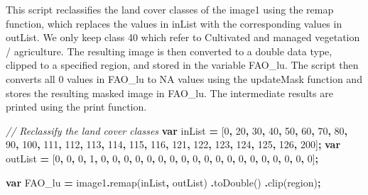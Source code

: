\documentclass[
  10pt,
  b5paper,
  oneside]{book}
\newenvironment{Shaded}{\begin{snugshade}}{\end{snugshade}}
\newcommand{\CommentTok}[1]{\textcolor[rgb]{0.56,0.35,0.01}{\textit{#1}}}
\newcommand{\DecValTok}[1]{\textcolor[rgb]{0.00,0.00,0.81}{#1}}
\newcommand{\FunctionTok}[1]{\textcolor[rgb]{0.00,0.00,0.00}{#1}}
\newcommand{\KeywordTok}[1]{\textcolor[rgb]{0.13,0.29,0.53}{\textbf{#1}}}
\newcommand{\NormalTok}[1]{#1}
\newcommand{\OperatorTok}[1]{\textcolor[rgb]{0.81,0.36,0.00}{\textbf{#1}}}
\begin{document}
This script reclassifies the land cover classes of the image1 using the remap function, which replaces the values in inList with the corresponding values in outList. We only keep class 40 which refer to Cultivated and managed vegetation / agriculture. The resulting image is then converted to a double data type, clipped to a specified region, and stored in the variable FAO\_lu. The script then converts all 0 values in FAO\_lu to NA values using the updateMask function and stores the resulting masked image in FAO\_lu. The intermediate results are printed using the print function.

\begin{Shaded}
\begin{Highlighting}[]
\CommentTok{// Reclassify the land cover classes}
\KeywordTok{var}\NormalTok{ inList }\OperatorTok{=}\NormalTok{ [}\DecValTok{0}\OperatorTok{,} \DecValTok{20}\OperatorTok{,} \DecValTok{30}\OperatorTok{,} \DecValTok{40}\OperatorTok{,} \DecValTok{50}\OperatorTok{,} \DecValTok{60}\OperatorTok{,} \DecValTok{70}\OperatorTok{,} \DecValTok{80}\OperatorTok{,} \DecValTok{90}\OperatorTok{,} \DecValTok{100}\OperatorTok{,} \DecValTok{111}\OperatorTok{,} 
               \DecValTok{112}\OperatorTok{,} \DecValTok{113}\OperatorTok{,} \DecValTok{114}\OperatorTok{,} \DecValTok{115}\OperatorTok{,} \DecValTok{116}\OperatorTok{,} 
              \DecValTok{121}\OperatorTok{,} \DecValTok{122}\OperatorTok{,} \DecValTok{123}\OperatorTok{,} \DecValTok{124}\OperatorTok{,} \DecValTok{125}\OperatorTok{,} \DecValTok{126}\OperatorTok{,} \DecValTok{200}\NormalTok{]}\OperatorTok{;}
\KeywordTok{var}\NormalTok{ outList }\OperatorTok{=}\NormalTok{ [}\DecValTok{0}\OperatorTok{,} \DecValTok{0}\OperatorTok{,} \DecValTok{0}\OperatorTok{,} \DecValTok{1}\OperatorTok{,} \DecValTok{0}\OperatorTok{,} \DecValTok{0}\OperatorTok{,} \DecValTok{0}\OperatorTok{,} \DecValTok{0}\OperatorTok{,} \DecValTok{0}\OperatorTok{,} \DecValTok{0}\OperatorTok{,} \DecValTok{0}\OperatorTok{,} \DecValTok{0}\OperatorTok{,}
\DecValTok{0}\OperatorTok{,} \DecValTok{0}\OperatorTok{,} \DecValTok{0}\OperatorTok{,} \DecValTok{0}\OperatorTok{,} \DecValTok{0}\OperatorTok{,} \DecValTok{0}\OperatorTok{,} \DecValTok{0}\OperatorTok{,} \DecValTok{0}\OperatorTok{,} \DecValTok{0}\OperatorTok{,} \DecValTok{0}\OperatorTok{,} \DecValTok{0}\NormalTok{]}\OperatorTok{;}

\KeywordTok{var}\NormalTok{ FAO\_lu }\OperatorTok{=}\NormalTok{ image1}\OperatorTok{.}\FunctionTok{remap}\NormalTok{(inList}\OperatorTok{,}\NormalTok{ outList)}
  \OperatorTok{.}\FunctionTok{toDouble}\NormalTok{()}
  \OperatorTok{.}\FunctionTok{clip}\NormalTok{(region)}\OperatorTok{;}


\end{Highlighting}
\end{Shaded}
\end{document}
